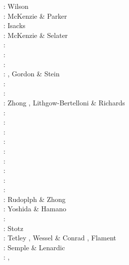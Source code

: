 \nineteensixtysix: Wilson \cite{wils66}\\
\nineteensixtyseven: McKenzie \& Parker \cite{mcpa67}\\
\nineteensixtyeight: Isacks \etal \cite{isos68} \\ 
\nineteenseventythree: McKenzie \& Selater \cite{mcse73}\\
\nineteenseventyfour: \cite{sosl74}\\
\nineteenseventyfive: \cite{harp75}\\
\nineteenninety: \cite{dega90}\\
\nineteenninetytwo: \cite{zieg92a}, Gordon \& Stein \cite{gost92}\\
\nineteenninetyfour: \cite{guto94}\\
\nineteenninetyseven: \cite{wean97b}\\
\nineteenninetyeight: Zhong \etal \cite{zhgm98}, Lithgow-Bertelloni \& Richards \cite{liri98}\\
\nineteenninetynine: \cite{ribr99}\\
\twothousandone: \cite{yohk01}\\
\twothousandtwo: \cite{stoc02}\\
\twothousandthree: \cite{evan03}\cite{reta03}\\
\twothousandseven: \cite{zhzl07}\\
\twothousandnine: \cite{lizh09}\cite{vasv09}\cite{iabu09}\cite{scbs09}\\
\twothousandten: \cite{stto10}\cite{dega10}\\
\twothousandtwelve: \cite{huss12}\cite{gutz12}\cite{qumm12}\cite{holr12}\cite{dost12}\cite{shbs12}\\
\twothousandthirteen: \cite{mosq13}\cite{cost13}\\
\twothousandfourteen: Rudoplph \& Zhong \cite{ruzh14} \\
\twothousandfifteen: Yoshida \& Hamano \cite{yoha15}\\
\twothousandsixteen: \cite{pric16}\\
\twothousandseventeen: Stotz \etal \cite{stid17}\\
\twothousandnineteen: Tetley \etal \cite{tewg19}, Wessel \& Conrad \cite{weco19}, 
                      Flament \cite{flam19}\\
\twothousandtwenty: Semple \& Lenardic \cite{sele20}\\
\twothousandtwentyone: 
,



